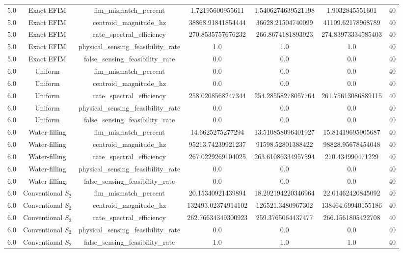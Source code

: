 \begin{table}[t]
\begin{tabular}{lcccccc}
5.0 & Exact EFIM & fim_mismatch_percent & 1.72195600955611 & 1.5406274639521198 & 1.9032845551601 & 40 \\
5.0 & Exact EFIM & centroid_magnitude_hz & 38868.91841854444 & 36628.21504740099 & 41109.62178968789 & 40 \\
5.0 & Exact EFIM & rate_spectral_efficiency & 270.8535757676232 & 266.8674181893923 & 274.83973334585403 & 40 \\
5.0 & Exact EFIM & physical_sensing_feasibility_rate & 1.0 & 1.0 & 1.0 & 40 \\
5.0 & Exact EFIM & false_sensing_feasibility_rate & 0.0 & 0.0 & 0.0 & 40 \\
6.0 & Uniform & fim_mismatch_percent & 0.0 & 0.0 & 0.0 & 40 \\
6.0 & Uniform & centroid_magnitude_hz & 0.0 & 0.0 & 0.0 & 40 \\
6.0 & Uniform & rate_spectral_efficiency & 258.0208568247344 & 254.28558278057764 & 261.75613086889115 & 40 \\
6.0 & Uniform & physical_sensing_feasibility_rate & 0.0 & 0.0 & 0.0 & 40 \\
6.0 & Uniform & false_sensing_feasibility_rate & 0.0 & 0.0 & 0.0 & 40 \\
6.0 & Water-filling & fim_mismatch_percent & 14.6625275277294 & 13.510858096401927 & 15.81419695905687 & 40 \\
6.0 & Water-filling & centroid_magnitude_hz & 95213.74239921237 & 91598.52801388422 & 98828.95678454048 & 40 \\
6.0 & Water-filling & rate_spectral_efficiency & 267.0229269104025 & 263.61086334957594 & 270.434990471229 & 40 \\
6.0 & Water-filling & physical_sensing_feasibility_rate & 0.0 & 0.0 & 0.0 & 40 \\
6.0 & Water-filling & false_sensing_feasibility_rate & 0.0 & 0.0 & 0.0 & 40 \\
6.0 & Conventional $S_2$ & fim_mismatch_percent & 20.15340921439894 & 18.292194220346964 & 22.01462420845092 & 40 \\
6.0 & Conventional $S_2$ & centroid_magnitude_hz & 132493.02374914102 & 126521.3480967302 & 138464.69940155186 & 40 \\
6.0 & Conventional $S_2$ & rate_spectral_efficiency & 262.76634349300923 & 259.3765064437477 & 266.1561805422708 & 40 \\
6.0 & Conventional $S_2$ & physical_sensing_feasibility_rate & 0.0 & 0.0 & 0.0 & 40 \\
6.0 & Conventional $S_2$ & false_sensing_feasibility_rate & 1.0 & 1.0 & 1.0 & 40 \\

\end{tabular}
\end{table}
